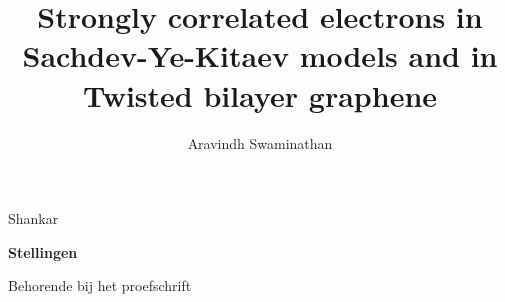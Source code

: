 \documentclass[pdftex,a5paper]{dissertation}
\begin{document}
\title{Strongly correlated electrons in Sachdev-Ye-Kitaev models and in Twisted bilayer graphene\\}
\author{Aravindh Swaminathan}{Shankar}

\begin{center}

{\Large\titlefont\bfseries Stellingen\\}

\vspace{2mm}
Behorende bij het proefschrift

\medskip



\bigskip

{\makeatletter
\titlestyle\bfseries\large\@title
\makeatother}

{\makeatletter
\ifx\@subtitle\undefined\else
    \titlefont\titleshape\@subtitle
\fi
\makeatother}

%
%


\end{center}

\smallskip
\end{document}
